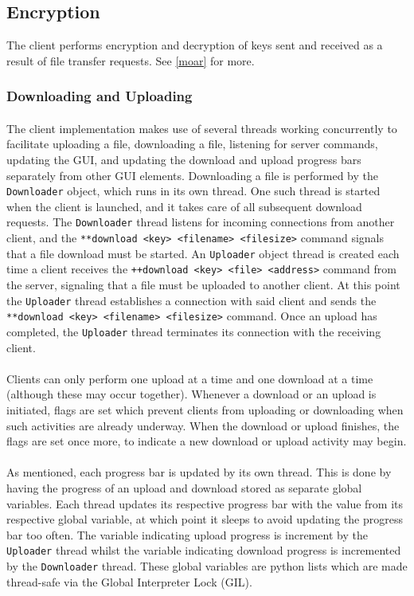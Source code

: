 \documentclass[10pt,a4paper]{article}
\begin{document}
\subsection{Encryption}
The client performs encryption and decryption of keys sent and received as a result of file transfer requests. See \ref{moar} for more.

\subsubsection{Downloading and Uploading}
\paragraph{} 
The client implementation makes use of several threads working concurrently to facilitate uploading a file, downloading a file, listening
for server commands, updating the GUI, and updating the download and upload 
progress bars separately from other GUI elements. Downloading a file is performed by the \verb|Downloader| object, which runs in its own thread. One such thread is
started when the client is launched, and it takes care of all subsequent download requests. The \verb|Downloader| thread listens
for incoming connections from another client, and the \verb|**download <key> <filename> <filesize>| command signals that a file download must be started. 
An \verb|Uploader| object thread is created each time a client receives the \verb|++download <key> <file> <address>| command from the server, signaling that
a file must be uploaded to another client. At this point the \verb|Uploader| thread establishes a connection with said client
and sends the \verb|**download <key> <filename> <filesize>| command. Once an upload has completed, the \verb|Uploader| thread terminates 
its connection with the receiving client.
\paragraph{} 
Clients can only perform one upload at a time and one download at a time (although these may occur together).
Whenever a download or an upload is initiated, flags are set which prevent clients from uploading or downloading when such
activities are already underway. When the download or upload finishes, the flags are set once more, to indicate a new download
or upload activity may begin.
\paragraph{} 
As mentioned, each progress bar is updated by its own thread. This is done by having the progress of an upload and download stored
as separate global variables. Each thread updates its respective progress bar with the value from its respective global variable, at which
point it sleeps to avoid updating the progress bar too often.
The variable indicating upload progress is increment by the \verb|Uploader| thread whilst the variable indicating download progress
is incremented by the \verb|Downloader| thread. These global variables are python lists which are made thread-safe via the Global Interpreter Lock (GIL).
\end{document}
